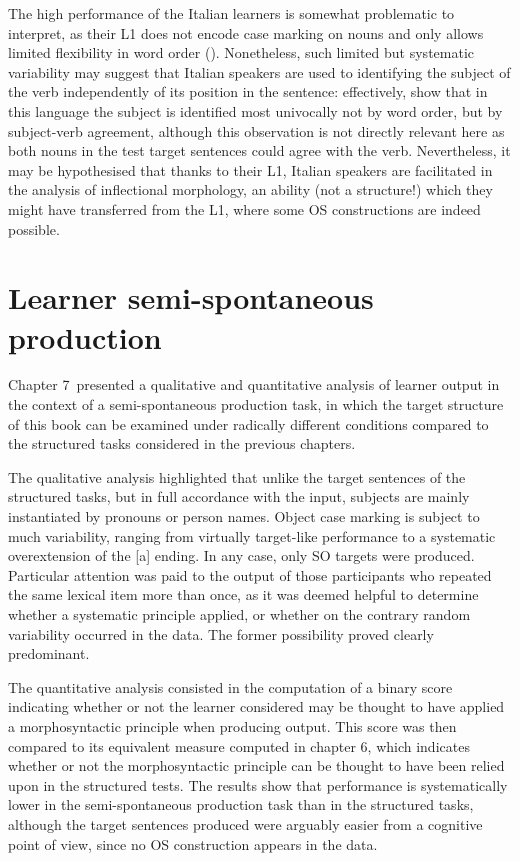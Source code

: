 The high performance of the Italian learners is somewhat problematic to interpret, as their L1 does not encode case marking on nouns and only allows limited flexibility in word order (\citealt{Jezek2003, Jezek2011, Jezek2016}). Nonetheless, such limited but systematic variability may suggest that Italian speakers are used to identifying the subject of the verb independently of its position in the sentence: effectively, \citet{MacWhinneyEtAl1984} show that in this language the subject is identified most univocally not by word order, but by subject-verb agreement, although this observation is not directly relevant here as both nouns in the test target sentences could agree with the verb. Nevertheless, it may be hypothesised that thanks to their L1, Italian speakers are facilitated in the analysis of inflectional morphology, an ability (not a structure!) which they might have transferred from the L1, where some OS constructions are indeed possible.

\section{Learner semi-spontaneous production}\label{sec:08:5}

Chapter 7~presented a qualitative and quantitative analysis of learner output in the context of a semi-spontaneous production task, in which the target structure of this book can be examined under radically different conditions compared to the structured tasks considered in the previous chapters.

The qualitative analysis highlighted that unlike the target sentences of the structured tasks, but in full accordance with the input, subjects are mainly instantiated by pronouns or person names.  Object case marking is subject to much variability, ranging from virtually target-like performance to a systematic overextension of the [a] ending. In any case, only SO targets were produced. Particular attention was paid to the output of those participants who repeated the same lexical item more than once, as it was deemed helpful to determine whether a systematic principle applied, or whether on the contrary random variability occurred in the data. The former possibility proved clearly predominant.

The quantitative analysis consisted in the computation of a binary score indicating whether or not the learner considered may be thought to have applied a morphosyntactic principle when producing output. This score was then compared to its equivalent measure computed in chapter 6, which indicates whether or not the morphosyntactic principle can be thought to have been relied upon in the structured tests. The results show that performance is systematically lower in the semi-spontaneous production task than in the structured tasks, although the target sentences produced were arguably easier from a cognitive point of view, since no OS construction appears in the data.

